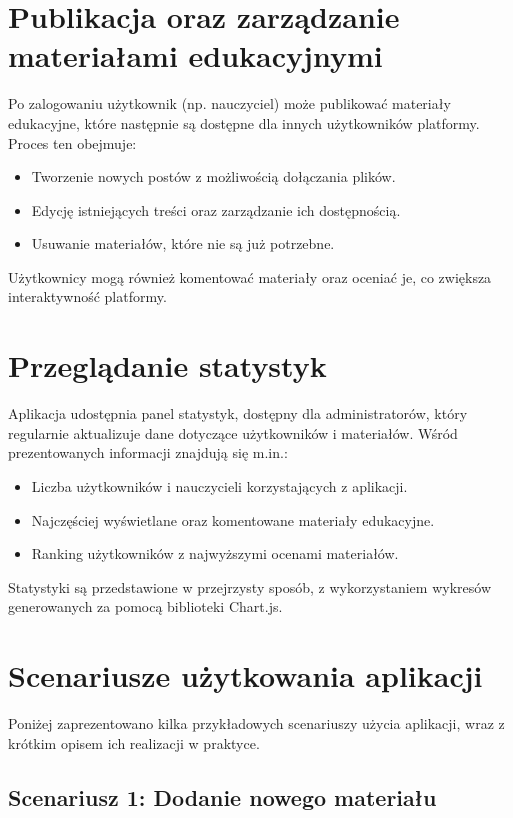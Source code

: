 \section{Publikacja oraz zarządzanie materiałami edukacyjnymi}

Po zalogowaniu użytkownik (np. nauczyciel) może publikować materiały edukacyjne, które następnie są dostępne dla innych użytkowników platformy. Proces ten obejmuje:

\begin{itemize}
    \item Tworzenie nowych postów z możliwością dołączania plików.
    \item Edycję istniejących treści oraz zarządzanie ich dostępnością.
    \item Usuwanie materiałów, które nie są już potrzebne.
\end{itemize}

Użytkownicy mogą również komentować materiały oraz oceniać je, co zwiększa interaktywność platformy.

\section{Przeglądanie statystyk}

Aplikacja udostępnia panel statystyk, dostępny dla administratorów, który regularnie aktualizuje dane dotyczące użytkowników i materiałów. Wśród prezentowanych informacji znajdują się m.in.:

\begin{itemize}
    \item Liczba użytkowników i nauczycieli korzystających z aplikacji.
    \item Najczęściej wyświetlane oraz komentowane materiały edukacyjne.
    \item Ranking użytkowników z najwyższymi ocenami materiałów.
\end{itemize}

Statystyki są przedstawione w przejrzysty sposób, z wykorzystaniem wykresów generowanych za pomocą biblioteki Chart.js.

\section{Scenariusze użytkowania aplikacji}

Poniżej zaprezentowano kilka przykładowych scenariuszy użycia aplikacji, wraz z krótkim opisem ich realizacji w praktyce.

\subsection{Scenariusz 1: Dodanie nowego materiału}

